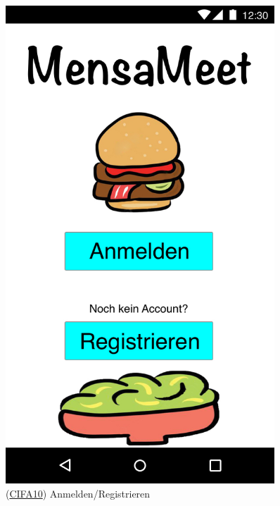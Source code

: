 \documentclass[a4paper]{scrreprt}
\begin{document}
\begin{figure}[H]
	\centering
	\begin{minipage}[b]{0.48\textwidth}
		\centering
		\includegraphics[width=0.9\textwidth]{res/GUI/01.jpeg}
		\label{Fig.1}
		(\hyperlink{cifa10}{CIFA10}) Anmelden/Registrieren
	\end{minipage}
	\begin{minipage}[b]{0.48\textwidth}
		\centering

\end{minipage}
\end{figure}
\end{document}
